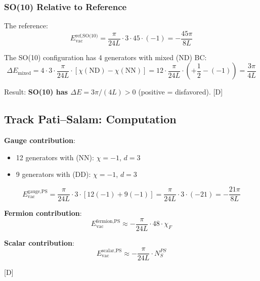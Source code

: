 \documentclass[11pt,a4paper]{article}
\newcommand{\tagD}{\textcolor{blue!70!black}{[D]}}
\begin{document}
\subsubsection{SO(10) Relative to Reference}

The reference:
\begin{equation}
\label{eq:so10-ref}
E_{\text{vac}}^{\text{ref,SO(10)}} = \frac{\pi}{24L} \cdot 3 \cdot 45 \cdot (-1) = -\frac{45\pi}{8L}
\end{equation}

The SO(10) configuration has 4 generators with mixed (ND) BC:
\begin{equation}
\label{eq:so10-mixed-contrib}
\Delta E_{\text{mixed}} = 4 \cdot 3 \cdot \frac{\pi}{24L} \cdot \left[\chi(\text{ND}) - \chi(\text{NN})\right]
= 12 \cdot \frac{\pi}{24L} \cdot \left(+\frac{1}{2} - (-1)\right) = \frac{3\pi}{4L}
\end{equation}

Result: \textbf{SO(10) has $\Delta E = 3\pi/(4L) > 0$} (positive = disfavored). \tagD

\subsection{Track Pati--Salam: Computation}

\begin{computebox}
\textbf{Gauge contribution}:
\begin{itemize}
    \item 12 generators with (NN): $\chi = -1$, $d = 3$
    \item 9 generators with (DD): $\chi = -1$, $d = 3$
\end{itemize}
\begin{equation}
\label{eq:ps-gauge}
E_{\text{vac}}^{\text{gauge,PS}} = \frac{\pi}{24L} \cdot 3 \cdot [12(-1) + 9(-1)]
= \frac{\pi}{24L} \cdot 3 \cdot (-21) = -\frac{21\pi}{8L}
\end{equation}

\textbf{Fermion contribution}:
\begin{equation}
\label{eq:ps-ferm}
E_{\text{vac}}^{\text{fermion,PS}} \approx -\frac{\pi}{24L} \cdot 48 \cdot \chi_F
\end{equation}

\textbf{Scalar contribution}:
\begin{equation}
\label{eq:ps-scalar}
E_{\text{vac}}^{\text{scalar,PS}} \approx -\frac{\pi}{24L} \cdot N_S^{PS}
\end{equation}

\tagD
\end{computebox}
\end{document}
